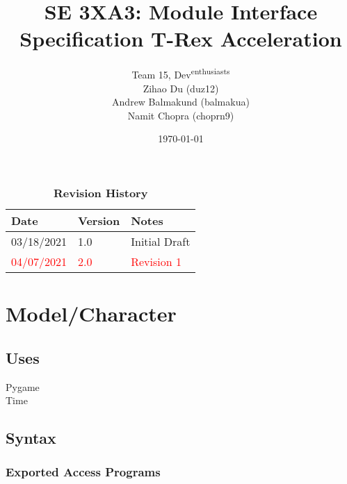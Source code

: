 \documentclass[12pt]{article}
\title{SE 3XA3: Module Interface Specification T-Rex Acceleration}
\author{Team 15, Dev\textsuperscript{enthusiasts}
		\\ Zihao Du (duz12)
		\\ Andrew Balmakund (balmakua) 
		\\ Namit Chopra (choprn9)
}
\date{\today}
\begin{document}
 
\maketitle

\begin{table}[bp]
\caption{\bf Revision History}
\begin{tabularx}{\textwidth}{p{3cm}p{2cm}X}
\toprule {\bf Date} & {\bf Version} & {\bf Notes}\\
\midrule
03/18/2021 & 1.0 & Initial Draft\\
\textcolor{red}{04/07/2021} & \textcolor{red}{2.0} & \textcolor{red}{Revision 1}\\
\bottomrule
\end{tabularx}
\end{table}

\newpage

\section* {Model/Character}

\subsection* {Uses}
Pygame\\
Time

\subsection* {Syntax}
\subsubsection* {Exported Access Programs}
\end{document}
